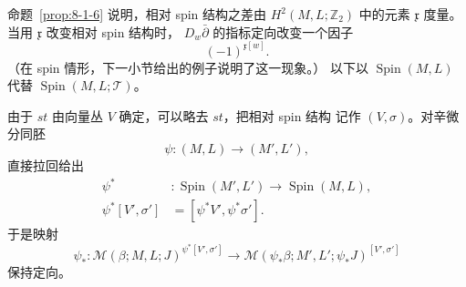 命题~\ref{prop:8-1-6} 说明，相对 spin 结构之差由
$H^2(M,L;\mathbb Z_2)$ 中的元素 $\mathfrak x$ 度量。
当用 $\mathfrak x$ 改变相对 spin 结构时，
$D_w\bar\partial$ 的指标定向改变一个因子
\[
(-1)^{\mathfrak x[w]}.
\]
（在 spin 情形，下一小节给出的例子说明了这一现象。）
以下以 $\operatorname{Spin}(M,L)$ 代替
$\operatorname{Spin}(M,L;\mathcal T)$。

由于 $st$ 由向量丛 $V$ 确定，可以略去 $st$，把相对 spin 结构
记作 $(V,\sigma)$。对辛微分同胚
\[
\psi\colon(M,L)\longrightarrow(M',L'),
\]
直接拉回给出
\[
\begin{split}
\psi^*&\colon\operatorname{Spin}(M',L')
\longrightarrow\operatorname{Spin}(M,L),\\
\psi^*[V',\sigma']&=[\psi^*V',\psi^*\sigma'].
\end{split}
\]
于是映射
\[
\psi_*\colon
\mathcal M(\beta;M,L;J)^{\psi^*[V',\sigma']}
\longrightarrow
\mathcal M(\psi_*\beta;M',L';\psi_*J)^{[V',\sigma']}
\]
保持定向。
